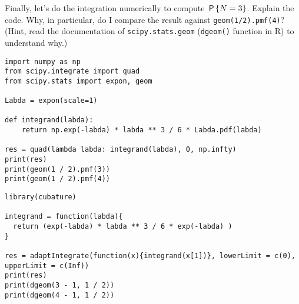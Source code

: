\begin{exercise}
Finally, let's do the integration numerically to compute $\P{N=3}$. Explain the code. Why, in particular, do I compare the result against \texttt{geom(1/2).pmf(4)}? (Hint, read the documentation of \texttt{scipy.stats.geom} (\texttt{dgeom()} function in R) to understand why.)
\begin{verbatim}
import numpy as np
from scipy.integrate import quad
from scipy.stats import expon, geom

Labda = expon(scale=1)

def integrand(labda):
    return np.exp(-labda) * labda ** 3 / 6 * Labda.pdf(labda)

res = quad(lambda labda: integrand(labda), 0, np.infty)
print(res)
print(geom(1 / 2).pmf(3))
print(geom(1 / 2).pmf(4))
\end{verbatim}

\begin{verbatim}
library(cubature)  

integrand = function(labda){
  return (exp(-labda) * labda ** 3 / 6 * exp(-labda) )
}

res = adaptIntegrate(function(x){integrand(x[1])}, lowerLimit = c(0), upperLimit = c(Inf))
print(res)
print(dgeom(3 - 1, 1 / 2))
print(dgeom(4 - 1, 1 / 2))
\end{verbatim}

\end{exercise}





